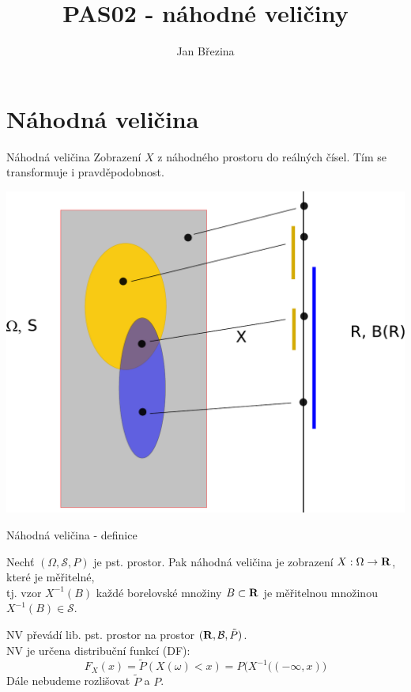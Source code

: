 \documentclass[smaller]{beamer}
\title{PAS02 - náhodné veličiny}
\author{Jan B\v rezina}
\institute %
{
  Technical University of Liberec
}
\def\to{\rightarrow}
\def\Real{{\rm\bf R}}
\def\blue#1{{\usebeamercolor[fg]{my blue} #1}}
\def\xskip{{\vspace{2ex}}}
\begin{document}
\begin{frame}
  \titlepage
\end{frame}

\def\df{\usebeamercolor[fg]{my red}\it}

\section{Náhodná veličina}

\begin{frame}{Náhodná veličina}
Zobrazení $X$ z náhodného prostoru do reálných čísel. Tím se transformuje i pravděpodobnost.

\vspace{2ex}
\begin{center}
 \includegraphics[scale=0.4]{nv.pdf}
\end{center}
\end{frame}


\begin{frame}{Náhodná veličina - definice}
\begin{definition}
 Nechť $(\Omega, \mathcal S, P)$ je pst. prostor.
 Pak náhodná veličina je zobrazení $X: \Omega \to \Real$, které je měřitelné,\\
 tj. vzor $X^{-1}(B)$ každé borelovské množiny $B\subset \Real$ je měřitelnou množinou $X^{-1}(B) \in \mathcal S$.
\end{definition}

\xskip
NV převádí lib. pst. prostor na prostor $(\Real, \mathcal B, \tilde P)$.\\

NV je určena \blue{distribuční funkcí} (DF): 
\[
   F_X(x) = \tilde P(X(\omega) < x) = P( X^{-1}\big(  (-\infty, x) \big)
\]
Dále nebudeme rozlišovat $\tilde P$ a $P$.
\end{frame}
\end{document}
